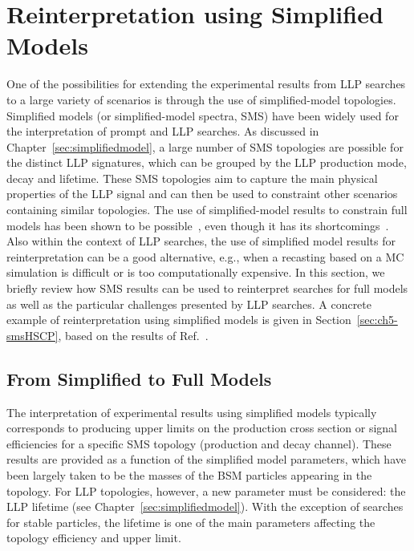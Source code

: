 \section{Reinterpretation using Simplified Models}
\label{sec:ch5-smsReinterpretations}

One of the possibilities for extending the experimental results from LLP
searches to a large variety of scenarios is through the use of simplified-model topologies.
Simplified models (or simplified-model spectra, SMS) have been widely used for the interpretation of
prompt and LLP searches. As discussed in Chapter~\ref{sec:simplifiedmodel}, a large
number of SMS topologies are possible for the distinct LLP signatures, which
can be grouped by the LLP production mode, decay and lifetime.
These SMS topologies aim to capture the main physical properties of the LLP
signal and can then be used to constraint other scenarios containing similar
topologies.
The use of simplified-model results to constrain full models has been
shown to be possible~\cite{Kraml:2013mwa,Papucci:2014rja,Belanger:2015cra,Barducci:2015zna,Arina:2015uea,Ambrogi:2017lov}, 
even though it has its shortcomings~\cite{Ambrogi:2017lov}.
Also within the context of LLP searches, the use of
simplified model results for reinterpretation can be a good alternative, e.g.,
when a recasting based on a MC simulation is difficult or
is too computationally expensive.
In this section, we briefly review how 
SMS results can be used to reinterpret searches for full
models as well as the particular challenges presented by LLP searches.
A concrete example of reinterpretation using simplified models is given in
Section~\ref{sec:ch5-smsHSCP}, based on the results of Ref.~\cite{Heisig:2015yla}.

\subsection{From Simplified to Full Models}

The interpretation of experimental results using
simplified models typically corresponds to producing upper limits on the production
cross section or signal efficiencies for a specific SMS topology (production and
decay channel). These results are provided as a function of the simplified model
parameters, which have been largely taken to be the masses of the BSM
particles appearing in the topology. For LLP topologies, however, 
a new parameter must be considered: the LLP lifetime (see Chapter~\ref{sec:simplifiedmodel}).
With the exception of searches for stable particles, the lifetime is one of the
main parameters affecting the topology efficiency and upper limit.

